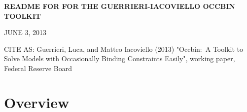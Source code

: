 \documentclass[12pt]{article}
\begin{document}
\setcounter{secnumdepth}{-1}%

\renewcommand{\baselinestretch}{1.05}
\normalsize%

\begin{center}
\textbf{README FOR FOR THE GUERRIERI-IACOVIELLO OCCBIN TOOLKIT}

JUNE 3, 2013
\end{center}

CITE AS: Guerrieri, Luca, and Matteo Iacoviello (2013) "Occbin:\ A Toolkit
to Solve Models with Occasionally Binding Constraints Easily", working
paper, Federal Reserve Board

\bigskip

\section{Overview}
\end{document}
